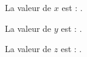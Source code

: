 \documentclass{article}
\begin{document}

La valeur de $x$ est : .

La valeur de $y$ est : .

La valeur de $z$ est : .
\end{document}
